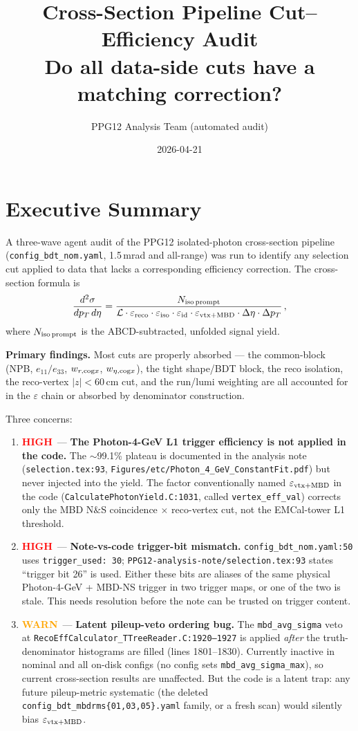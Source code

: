 \documentclass[11pt,a4paper]{article}
\title{Cross-Section Pipeline Cut--Efficiency Audit\\
\large Do all data-side cuts have a matching correction?}
\author{PPG12 Analysis Team (automated audit)}
\date{2026-04-21}
\newcommand{\crit}[1]{\textcolor{red}{\textbf{#1}}}
\newcommand{\warn}[1]{\textcolor{orange}{\textbf{#1}}}
\begin{document}
\maketitle

\section*{Executive Summary}

A three-wave agent audit of the PPG12 isolated-photon cross-section
pipeline (\texttt{config\_bdt\_nom.yaml}, 1.5\,mrad and all-range)
was run to identify any selection cut applied to data that lacks a
corresponding efficiency correction. The cross-section formula is
\[
\frac{d^2\sigma}{dp_T\,d\eta}
= \frac{N_{\rm iso\,prompt}}{\mathcal{L}\cdot \varepsilon_{\rm reco}\cdot \varepsilon_{\rm iso}\cdot \varepsilon_{\rm id}\cdot \varepsilon_{\rm vtx+MBD}\cdot \Delta\eta\cdot \Delta p_T}\,,
\]
where $N_{\rm iso\,prompt}$ is the ABCD-subtracted, unfolded signal
yield.

\textbf{Primary findings.} Most cuts are properly absorbed --- the
common-block (NPB, $e_{11}/e_{33}$, $w_{r,{\rm cog}x}$,
$w_{\eta,{\rm cog}x}$), the tight shape/BDT block, the reco isolation,
the reco-vertex $|z|<60$\,cm cut, and the run/lumi weighting are all
accounted for in the $\varepsilon$ chain or absorbed by denominator
construction.

Three concerns:
\begin{enumerate}
  \item \crit{HIGH}\ --- \textbf{The Photon-4-GeV L1 trigger efficiency
  is not applied in the code.} The $\sim$99.1\% plateau is documented
  in the analysis note (\texttt{selection.tex:93}, \texttt{Figures/etc/Photon\_4\_GeV\_ConstantFit.pdf})
  but never injected into the yield. The factor conventionally named
  $\varepsilon_{\rm vtx+MBD}$ in the code
  (\texttt{CalculatePhotonYield.C:1031}, called \texttt{vertex\_eff\_val})
  corrects only the MBD N$\&$S coincidence $\times$ reco-vertex cut, not
  the EMCal-tower L1 threshold.
  \item \crit{HIGH}\ --- \textbf{Note-vs-code trigger-bit mismatch.}
  \texttt{config\_bdt\_nom.yaml:50} uses \texttt{trigger\_used: 30};
  \texttt{PPG12-analysis-note/selection.tex:93} states ``trigger bit
  26'' is used. Either these bits are aliases of the same physical
  Photon-4-GeV + MBD-NS trigger in two trigger maps, or one of the two
  is stale. This needs resolution before the note can be trusted on
  trigger content.
  \item \warn{WARN}\ --- \textbf{Latent pileup-veto ordering bug.} The
  \texttt{mbd\_avg\_sigma} veto at \texttt{RecoEffCalculator\_TTreeReader.C:1920--1927}
  is applied \emph{after} the truth-denominator histograms are filled
  (lines 1801--1830). Currently inactive in nominal and all on-disk
  configs (no config sets \texttt{mbd\_avg\_sigma\_max}), so current
  cross-section results are unaffected. But the code is a latent trap:
  any future pileup-metric systematic (the deleted
  \texttt{config\_bdt\_mbdrms\{01,03,05\}.yaml} family, or a fresh scan)
  would silently bias $\varepsilon_{\rm vtx+MBD}$.
\end{enumerate}
\end{document}
